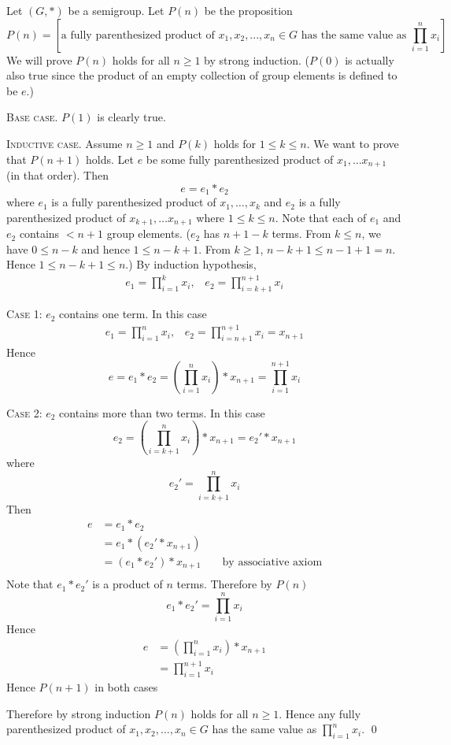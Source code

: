\proof
Let $(G, *)$ be a semigroup. Let $P(n)$ be the proposition
\[
P(n) = \left[
\text{a fully parenthesized product of } x_1, x_2, ..., x_n \in G
\text{ has the same value as }
\prod_{i = 1}^n x_i
\right]
\]
We will prove $P(n)$ holds for all $n \geq 1$ by strong induction.
($P(0)$ is actually also true since the product of an empty collection
of group elements is defined to be $e$.)

\textsc{Base case}. $P(1)$ is clearly true.

\textsc{Inductive case}.
Assume $n \geq 1$ and $P(k)$ holds for $1 \leq k \leq n$.
We want to prove that $P(n + 1)$ holds.
Let $e$ be some fully parenthesized product of $x_1, \ldots x_{n + 1}$
(in that order).
Then
\[
e = e_1 * e_2
\]
where
$e_1$ is a fully parenthesized product of $x_1, \ldots, x_k$
and
$e_2$ is a fully parenthesized product of $x_{k+1}, \ldots x_{n+1}$
where $1 \leq k \leq n$.
Note that each of $e_1$ and $e_2$ contains $< n + 1$ group elements.
($e_2$ has $n + 1 - k$ terms.
From $k \leq n$, we have $0 \leq n - k$ and hence $1 \leq n - k + 1$.
From $k \geq 1$, $n - k + 1 \leq n - 1 + 1 = n$.
Hence $1 \leq n - k + 1 \leq n$.)
By induction hypothesis, 
\begin{align*}
e_1 = \prod_{i = 1}^k x_i, \,\,\,\,\, e_2 = \prod_{i = k + 1}^{n + 1} x_i
\end{align*}

\textsc{Case 1:} $e_2$ contains one term.
In this case
\begin{align*}
e_1 = \prod_{i = 1}^n x_i, \,\,\,\,\, e_2 = \prod_{i = n + 1}^{n + 1} x_i = x_{n+1}
\end{align*}
Hence
\[
e = e_1*e_2 = \left( \prod_{i = 1}^n x_i \right) * x_{n+1} = \prod_{i = 1}^{n+1} x_i
\]

\textsc{Case 2:} $e_2$ contains more than two terms.
In this case
\[
e_2 = \left(\prod_{i = k + 1}^{n} x_i\right) * x_{n + 1} = e_2' * x_{n + 1}
\]
where
\[
e_2' = \prod_{i = k + 1}^{n} x_i
\]
Then
\begin{align*}
e
&= e_1 * e_2 \\
&= e_1 * (e_2' * x_{n + 1}) \\
&= (e_1 * e_2') * x_{n + 1} & & \text{ by associative axiom}\\
\end{align*}
Note that $e_1 * e_2'$ is a product of $n$ terms.
Therefore by $P(n)$
\[
e_1 * e_2' = \prod_{i=1}^n x_i
\]
Hence
\begin{align*}
e
&= \left( \prod_{i=1}^n x_i  \right) * x_{n + 1} \\
&= \prod_{i=1}^{n+1} x_i
\end{align*}
Hence $P(n+1)$ in both cases

Therefore by strong induction $P(n)$ holds for all $n \geq 1$.
Hence any fully parenthesized product of $x_1, x_2, ..., x_n \in G$
has the same value as $\prod_{i = 1}^n x_i$.
\qed
